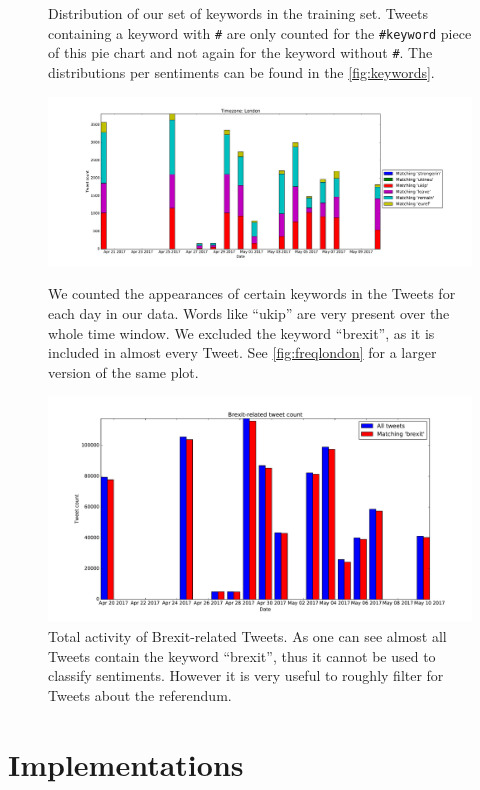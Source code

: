 \documentclass{emulateapj}
\begin{document}
\begin{figure}
  \caption{Distribution of our set of keywords in the training set. Tweets containing a keyword with \texttt\# are only counted for the 
           \texttt{\#keyword} piece of this pie chart and not again for the keyword without \texttt\#. 
           The distributions per sentiments can be found in the \cref{fig:keywords}.\label{fig:total-ssixKeywords}}
  \includegraphics[width=1.1\linewidth]{img/frequency_stacked_London.pdf}
  \caption{We counted the appearances of certain keywords in the Tweets for each day in our data.
           Words like ``ukip'' are very present over the whole time window. We excluded the keyword ``brexit'',
           as it is included in almost every Tweet. See \cref{fig:freqlondon} for a larger version of the same plot.\label{fig:frequency-london}}
  \includegraphics[width=1.1\linewidth]{img/frequency_brexit.pdf}
  \caption{Total activity of Brexit-related Tweets. As one can see almost all Tweets contain the keyword ``brexit'',
           thus it cannot be used to classify sentiments. However it is very useful to roughly filter for Tweets about
           the referendum.\label{fig:frequency-tot}}
\end{figure}
\clearpage

\section{Implementations}\label{sec:implementations}
\end{document}
